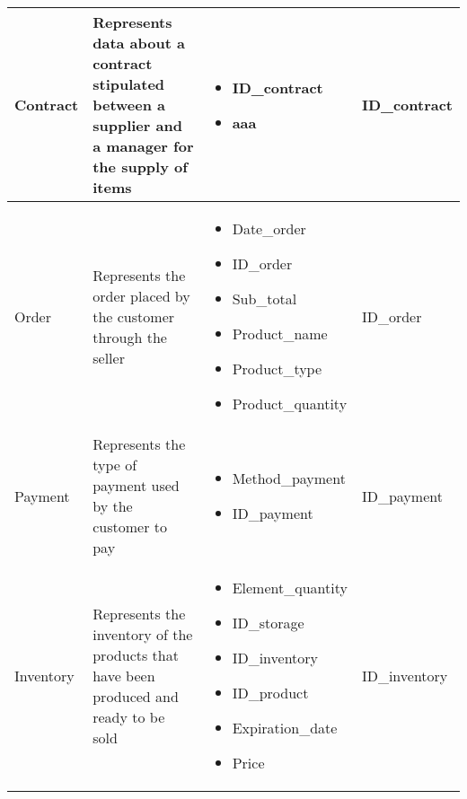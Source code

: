 \begin{longtable}{|p{}|p{} |p{}|p{} |}
    Contract & Represents data about a contract stipulated between a supplier and a manager for the supply of items &
    \begin{itemize}
        \vspace{-1em}
        \item ID\_contract
        \item aaa
    \end{itemize}
    &  ID\_contract\\\hline

    Order & Represents the order placed by the customer through the seller &
    \begin{itemize}
        \vspace{-1em}
        \item Date\_order
        \item ID\_order
        \item Sub\_total
        \item Product\_name
        \item Product\_type
        \item Product\_quantity
    \end{itemize}
    &  ID\_order\\\hline

    Payment & Represents the type of payment used by the customer to pay &
    \begin{itemize}
        \vspace{-1em}
        \item Method\_payment
        \item ID\_payment
    \end{itemize}
    &  ID\_payment\\\hline

    Inventory & Represents the inventory of the products that have been produced and ready to be sold &
    \begin{itemize}
        \vspace{-1em}
        \item Element\_quantity
        \item ID\_storage
        \item ID\_inventory
        \item ID\_product
        \item Expiration\_date
        \item Price     %
    \end{itemize}
    &  ID\_inventory \\\hline


\end{longtable}
